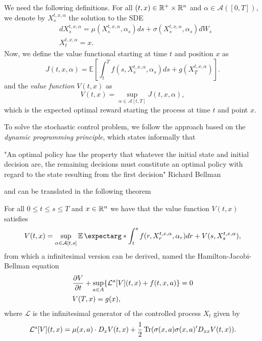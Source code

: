 We need the following definitions. For all $(t,x)\in \mathbb{R}^{+}\times \mathbb{R}^n$ and $\alpha \in \mathcal{A}([0,T])$, we denote by $X_s^{t,x,\alpha}$ the solution to the SDE
\begin{equation}
	\begin{split}
	&dX_{s}^{t,x,\alpha}=\mu(X_{s}^{t,x,\alpha},\alpha_s)ds+\sigma(X_{s}^{t,x,\alpha},\alpha_s)dW_s\\
	&X_t^{t,x,\alpha}=x.
	\end{split}
\end{equation}
Now, we define the value functional starting at time $t$ and position $x$ as
\begin{equation}
	J(t,x,\alpha)=\mathbb{E}\left[\int_{t}^{T}f(s,X_s^{t,x,\alpha},\alpha_s) ds +g(X_T^{t,x,\alpha})\right].
\end{equation}
and the \textit{value function} $V(t,x)$ as
\begin{equation}
	V(t,x)=\sup_{\alpha\in\mathcal{A}[t,T]}J(t,x,\alpha),
\end{equation}
which is the expected optimal reward starting the process at time $t$ and point $x$.

To solve the stochastic control problem, we follow the approach based on the \textit{dynamic programming principle}, which states informally that 

\begin{center}
	"An optimal policy has the
	property that whatever the
	initial state and initial decision are, the remaining decisions must constitute an
	optimal policy with regard
	to the state resulting from
	the first decision"
	Richard Bellman
\end{center}
and can be translated in the following theorem
\begin{thm}
	For all $0\leq t\leq s\leq T$ and $x\in\mathbb{R}^n$ we have that the value function $V(t,x)$ satisfies 
	\begin{equation}
		V(t,x)=\sup_{\alpha\in \mathcal{A}[t,s]}\expect*{\int_{t}^{s}f(r,X_r^{t,x,\alpha},\alpha_r)dr+V(s,X_s^{t,x,\alpha})},
	\end{equation}
from which a infinitesimal version can be derived, named the Hamilton-Jacobi-Bellman equation 
\begin{equation}
	\begin{split}
		&\frac{\partial V}{\partial t}+\sup_{a\in A}\{\mathcal{L}^a[V](t,x)+f(t,x,a)\}=0\\
		&V(T,x)=g(x),
	\end{split}
\end{equation}
where $\mathcal{L}$ is the infinitesimal generator of the controlled process $X_t$ given by
\begin{equation}
	\mathcal{L}^a[V](t,x)=\mu(x,a)\cdot D_x V(t,x)+\frac{1}{2}\operatorname{Tr}(\sigma(x,a)\sigma(x,a)'D_{xx}V(t,x)).
\end{equation}
\end{thm}

